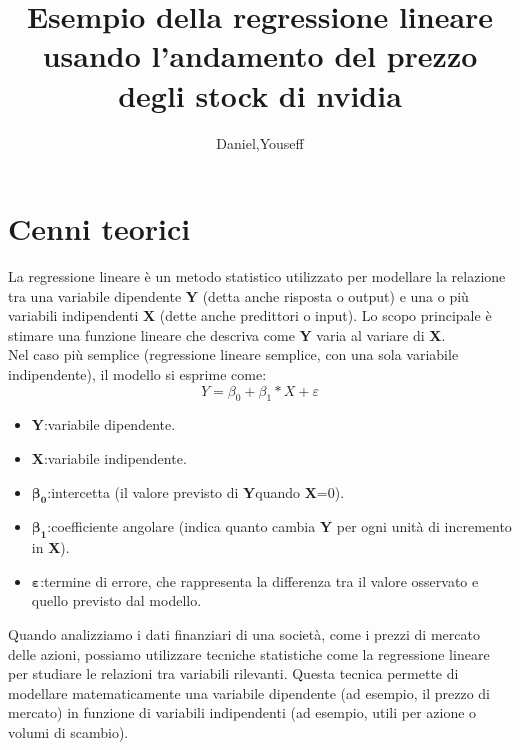 \documentclass[12pt]{article}
\author{Daniel,Youseff}
\title{Esempio della regressione lineare usando l'andamento del prezzo degli stock di nvidia}
\begin{document}
\maketitle
\section*{Cenni teorici}
La regressione lineare è un metodo statistico utilizzato per modellare la relazione tra una variabile dipendente
\textbf{Y} (detta anche risposta o output) e una o più variabili indipendenti 
\textbf{X} (dette anche predittori o input). Lo scopo principale è stimare una funzione lineare che descriva come \textbf{Y} 
varia al variare di \textbf{X}.
\\Nel caso più semplice (regressione lineare semplice, con una sola variabile indipendente), il modello si esprime come:
\begin{equation}
    Y=\beta_0+\beta_1*X+\varepsilon  
\end{equation}
\begin{itemize}
    \item \textbf{Y}:variabile dipendente.
    \item \textbf{X}:variabile indipendente.
    \item \begin{math}\mathbf{\beta_0}\end{math}:intercetta (il valore previsto di \textbf{Y}quando \textbf{X}=0).
    \item \begin{math} \mathbf{\beta_1}\end{math}:coefficiente angolare (indica quanto cambia \textbf{Y} per ogni unità
          di incremento in \textbf{X}).
    \item \begin{math}\mathbf{\varepsilon}\end{math}:termine di errore, che rappresenta la differenza
          tra il valore osservato e quello previsto dal modello.       
\end{itemize}
Quando analizziamo i dati finanziari di una società, come i prezzi di mercato delle azioni, possiamo utilizzare tecniche statistiche come la regressione lineare per studiare 
le relazioni tra variabili rilevanti. Questa tecnica permette di modellare matematicamente una variabile 
dipendente (ad esempio, il prezzo di mercato) in funzione di variabili indipendenti (ad esempio, utili per azione o volumi di scambio).
\end{document}
